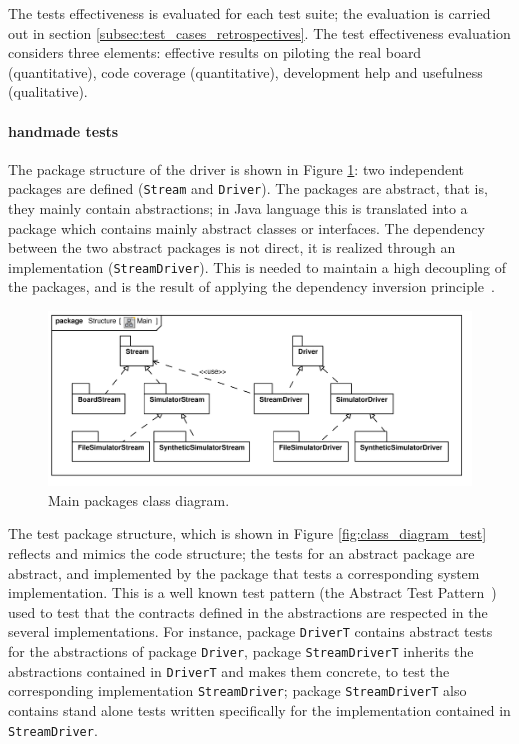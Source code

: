 \documentclass[english]{lni}
\newcommand{\lil}[1]{\texttt{\lstinline|#1|}}
\begin{document}
The tests effectiveness is evaluated for each test suite; the evaluation is carried out in section \ref{subsec:test_cases_retrospectives}.
The test effectiveness evaluation considers three elements: effective results on piloting the real board (quantitative), code coverage
(quantitative), development help and usefulness (qualitative).

\paragraph*{handmade tests}

The package structure of the driver is shown in Figure \ref{fig:class_diagram_main}: two independent packages are defined (\lil{Stream} and \lil{Driver}).  
The packages are abstract, that is, they mainly contain abstractions; in Java language this is translated into a package which contains mainly abstract classes or interfaces.  
The dependency between the two abstract packages is not direct, it is realized through an implementation (\lil{StreamDriver}).
This is needed to maintain a high decoupling of the packages, and is the result of applying the dependency inversion principle~\cite{Martin1996}.

\begin{figure}[htb!]
  \centering
  \includegraphics[scale=0.7]{UML_model/Class_Diagram__Structure__Main}
  \caption{Main packages class diagram.}
  \label{fig:class_diagram_main}
\end{figure}

The test package structure, which is shown in Figure \ref{fig:class_diagram_test} reflects and mimics the code structure; the tests for an abstract package are abstract, and implemented by the package that tests a corresponding system implementation. 
This is a well known test pattern (the Abstract Test Pattern~\cite{Thomas2004}) used to test that the contracts defined in the abstractions are respected in the several implementations.  
For instance, package \lil{DriverT} contains abstract tests for the abstractions of package \lil{Driver}, package \lil{StreamDriverT} inherits the abstractions contained in \lil{DriverT} and makes them concrete, to test the corresponding implementation \lil{StreamDriver}; package \lil{StreamDriverT} also contains stand alone tests written specifically for the implementation contained in \lil{StreamDriver}.
\end{document}
